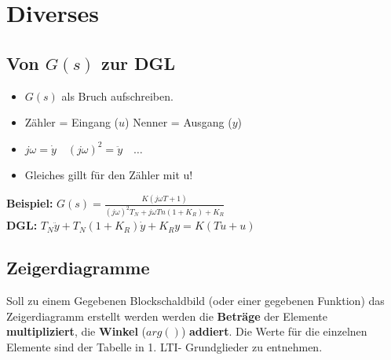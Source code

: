 \section{Diverses}

\subsection{Von $G(s)$ zur DGL}
  \begin{multicols}{2}
    \begin{itemize}
      \item $G(s)$ als Bruch aufschreiben.
			\item Zähler = Eingang ($u$) \quad Nenner = Ausgang ($y$)
 			\item $j\omega = \dot{y} \quad (j\omega)^2 = \ddot{y} \quad \ldots $
 			\item Gleiches gillt für den Zähler mit u!
		\end{itemize}
	\columnbreak
		\textbf{Beispiel:} $G(s) = \frac{K(j \omega T + 1)}{(j\omega)^2 T_N + j \omega Tn(1+K_R) + K_R}$ \\			
		\textbf{DGL:} $T_N \ddot{y} + T_N(1+K_R) \dot{y} + K_R y = K(T \dot{u} + u)$
  \end{multicols}    	
    
\subsection{Zeigerdiagramme}
  Soll zu einem Gegebenen Blockschaldbild (oder einer gegebenen Funktion) das Zeigerdiagramm erstellt 
  werden werden die \textbf{Beträge} der Elemente \textbf{multipliziert},
  die \textbf{Winkel} ($arg()$) \textbf{addiert}. Die Werte für die einzelnen Elemente sind der Tabelle in 1. LTI-  
  Grundglieder zu entnehmen. 

